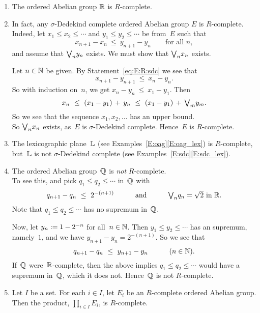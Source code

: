\documentclass[main.tex]{subfiles}
\begin{document}
\begin{exs}
\label{E:R-complete}
\begin{enumerate}
\item
\label{E:R-complete-R}
The ordered Abelian group $\mathbb{R}$ is $R$-complete.

\item
In fact, any $\sigma$-Dedekind complete 
ordered Abelian group $E$ is $R$-complete.\\
Indeed,
let $x_1 \leq x_2 \leq \dotsb$ 
and $y_1 \leq y_2 \leq \dotsb$
be from~$E$
such that
\begin{equation}
\label{eq:E:R:sdc}
x_{n+1} - x_n \ \leq\ y_{n+1}-y_n
\qquad\text{for all }n,
\end{equation}
and assume that $\textstyle{\bigvee}_n y_n$ exists.
We must show that $\textstyle{\bigvee}_n x_n$ exists.

Let $n\in\mathbb{N}$ be given.
By Statement~\eqref{eq:E:R:sdc}
we see that
\begin{equation*}
x_{n+1} - y_{n+1} \ \leq\ x_n - y_n.
\end{equation*}
So with induction on~$n$, we get $x_n - y_n \ \leq\ x_1 - y_1$.
Then
\begin{equation*}
x_n \ \leq\ 
(x_1 - y_1) \,+\, y_n  \ \leq\ 
(x_1 - y_1) \,+\, \bv_m y_m.
\end{equation*}
So we see that the sequence $x_1,x_2,\dotsc$ 
has an upper bound.\\
So $\textstyle{\bigvee}_n x_n$ exists,
as~$E$ is $\sigma$-Dedekind complete.
Hence~$E$ is $R$-complete.


\item
The lexicographic plane~$\mathbb{L}$ (see Examples~\ref{E:oag}\ref{E:oag_lex})
is $R$-complete,
but~$\mathbb{L}$ is not $\sigma$-Dedekind complete
(see Examples~\ref{E:sdc}\ref{E:sdc_lex}).

\item
The ordered Abelian group~$\mathbb{Q}$ is \emph{not} $R$-complete.\\
To see this,
and pick $q_1 \leq q_2\leq \dotsb$ in~$\mathbb{Q}$
with
\begin{equation*}
q_{n+1} - q_{n} \ \leq\ 2^{-(n+1)}
\qquad\quad\text{and}\quad\qquad  \text{$\textstyle{\bigvee}_n q_n = \sqrt{2}$ in~$\mathbb{R}$.}
\end{equation*}
Note that $q_1\leq q_2 \leq \dotsb$
has no supremum in~$\mathbb{Q}$.

Now, let $y_n := 1-2^{-n}$ for all~$n\in\mathbb{N}$.
Then $y_1 \leq y_2 \leq \dotsb$ has an supremum, namely~$1$,
and we have $y_{n+1} - y_{n} = 2^{-(n+1)}$. So we see that
\begin{equation*}
q_{n+1} - q_{n} \ \leq\ y_{n+1} - y_n
\qquad\quad(n\in\N).
\end{equation*}
If~$\mathbb{Q}$ were~$\mathbb{R}$-complete,
then the above implies 
 $q_1 \leq q_2 \leq \dotsb$
would have a supremum in~$\mathbb{Q}$,
which it does not.
Hence~$\mathbb{Q}$ is not $R$-complete.

\item
\label{E:R-complete-product}
Let $I$ be a set.
For each $i\in I$,
let $E_i$ be an $R$-complete
ordered Abelian group.
Then the product, $\prod_{i\in I} E_i$,
is $R$-complete.
\end{enumerate}
\end{exs}
\end{document}
